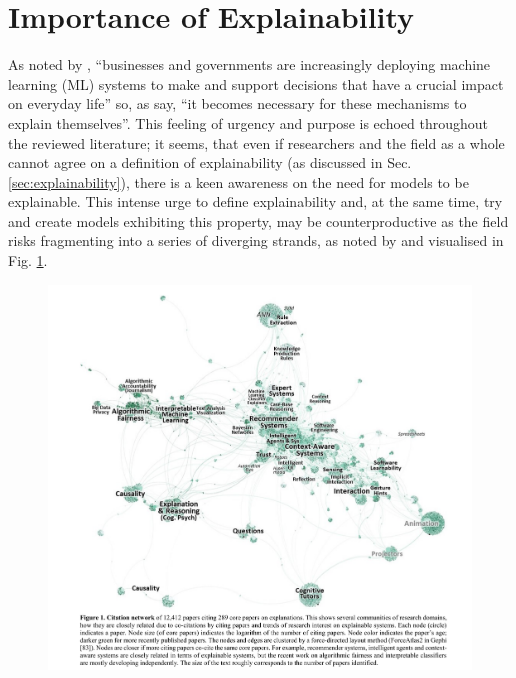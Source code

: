 \section{Importance of Explainability} \label{sec:importance-of-explainability}
As noted by \cite{edwards2018enslaving}, \enquote{businesses and governments are increasingly deploying machine learning (ML) systems to make and support decisions that have a crucial impact on everyday life} so, as \cite{gilpin2018explaining} say, \enquote{it becomes necessary for these mechanisms to explain themselves}.
This feeling of urgency and purpose is echoed throughout the reviewed literature; it seems, that even if researchers and the field as a whole cannot agree on a definition of explainability (as discussed in Sec. \ref{sec:explainability}), there is a keen awareness on the need for models to be explainable.
This intense urge to define explainability and, at the same time, try and create models exhibiting this property, may be counterproductive as the field risks fragmenting into a series of diverging strands, as noted by \cite{abdul2018trends} and visualised in Fig. \ref{fig:xai-citation-network}.

\begin{figure}[htbp]
\centerline{\includegraphics[width=\columnwidth]{literature-review/images/xai-citation-network}}
\caption{\cite{abdul2018trends}}
\label{fig:xai-citation-network}
\end{figure}

